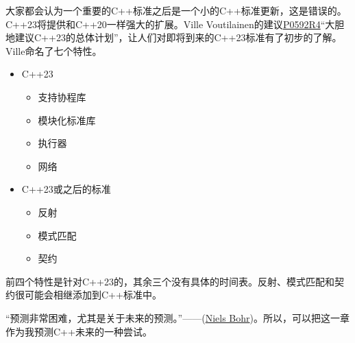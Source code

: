 大家都会认为一个重要的C++标准之后是一个小的C++标准更新，这是错误的。C++23将提供和C++20一样强大的扩展。Ville Voutilainen的建议\href{http://www.open-std.org/jtc1/sc22/wg21/docs/papers/2019/p0592r4.html}{P0592R4}“大胆地建议C++23的总体计划”，让人们对即将到来的C++23标准有了初步的了解。Ville命名了七个特性。

\begin{itemize}
\item 
C++23
\begin{itemize}
\item 
支持协程库

\item 
模块化标准库

\item 
执行器

\item 
网络
\end{itemize}

\item 
C++23或之后的标准
\begin{itemize}
\item 
反射

\item 
模式匹配

\item 
契约
\end{itemize}
\end{itemize}

前四个特性是针对C++23的，其余三个没有具体的时间表。反射、模式匹配和契约很可能会相继添加到C++标准中。

“预测非常困难，尤其是关于未来的预测。”——(\href{https://www.goodreads.com/quotes/23796-prediction-is-very-difficult-especially-about-the-future}{Niels Bohr})。所以，可以把这一章作为我预测C++未来的一种尝试。















